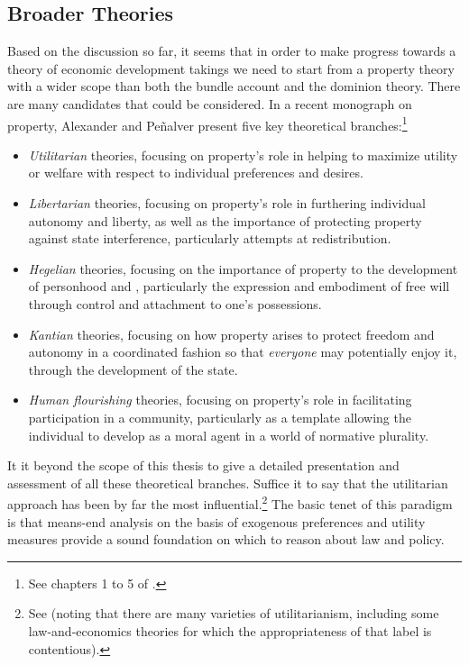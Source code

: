 \subsection{Broader Theories}\label{sec:2:3:2}

Based on the discussion so far, it seems that in order to make progress towards a theory of economic development takings we need to start from a property theory with a wider scope than both the bundle account and the dominion theory. There are many candidates that could be considered. In a recent monograph on property, Alexander and Pe\~{n}alver present five key theoretical branches:\footnote{See chapters 1 to 5 of \cite{alexander12}.}
\begin{itemize}
\item {\it Utilitarian} theories, focusing on property's role in helping to maximize utility or welfare with respect to individual preferences and desires. 
\item {\it Libertarian} theories, focusing on property's role in furthering individual autonomy and liberty, as well as the importance of protecting property against state interference, particularly attempts at redistribution. 
\item {\it Hegelian} theories, focusing on the importance of property to the development of personhood and , particularly the expression and embodiment of free will through control and attachment to one's possessions.
\item {\it Kantian} theories, focusing on how property arises to protect freedom and autonomy in a coordinated fashion so that {\it everyone} may potentially enjoy it, through the development of the state.
\item {\it  Human flourishing} theories, focusing on property's role in facilitating participation in a community, particularly as a template allowing the individual to develop as a moral agent in a world of normative plurality.
\end{itemize}

It it beyond the scope of this thesis to give a detailed presentation and assessment of all these theoretical branches. Suffice it to say that the utilitarian approach has been by far the most influential.\footnote{See \cite[11]{alexander12} (noting that there are many varieties of utilitarianism, including some law-and-economics theories for which the appropriateness of that label is contentious).} The basic tenet of this paradigm is that means-end analysis on the basis of exogenous preferences and utility measures provide a sound foundation on which to reason about law and policy.

